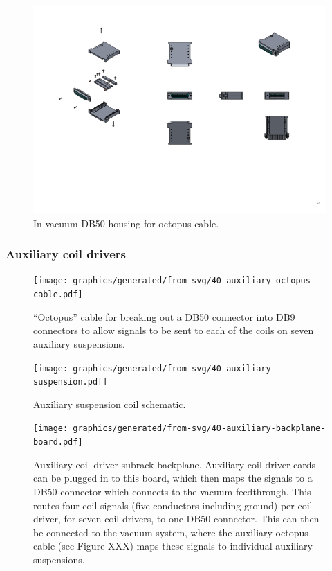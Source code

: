 \begin{figure}
  \centering
  \includegraphics[width=0.75\columnwidth]{graphics/40-db50-housing.png}
  \caption[In-vacuum DB50 octopus cable housing]{In-vacuum DB50 housing for octopus cable.}
  \label{fig:db50-housing}
\end{figure}

\subsubsection{Auxiliary coil drivers}

\begin{figure}
  \centering
  \texttt{[image: graphics/generated/from-svg/40-auxiliary-octopus-cable.pdf]}
  \caption[Auxiliary octopus cable schematic]{\label{fig:aux-octopus-cable-wiring}``Octopus'' cable for breaking out a DB50 connector into DB9 connectors to allow signals to be sent to each of the coils on seven auxiliary suspensions.}
\end{figure}

\begin{figure}
  \centering
  \texttt{[image: graphics/generated/from-svg/40-auxiliary-suspension.pdf]}
  \caption[Auxiliary suspension coil schematic]{\label{fig:aux-suspension-wiring}Auxiliary suspension coil schematic.}
\end{figure}

\begin{figure}
  \centering
  \texttt{[image: graphics/generated/from-svg/40-auxiliary-backplane-board.pdf]}
  \caption[Auxiliary subrack backplane board schematic]{\label{fig:aux-backplane-schematic}Auxiliary coil driver subrack backplane. Auxiliary coil driver cards can be plugged in to this board, which then maps the signals to a DB50 connector which connects to the vacuum feedthrough. This routes four coil signals (five conductors including ground) per coil driver, for seven coil drivers, to one DB50 connector. This can then be connected to the vacuum system, where the auxiliary octopus cable (see Figure XXX) maps these signals to individual auxiliary suspensions.}
\end{figure}

